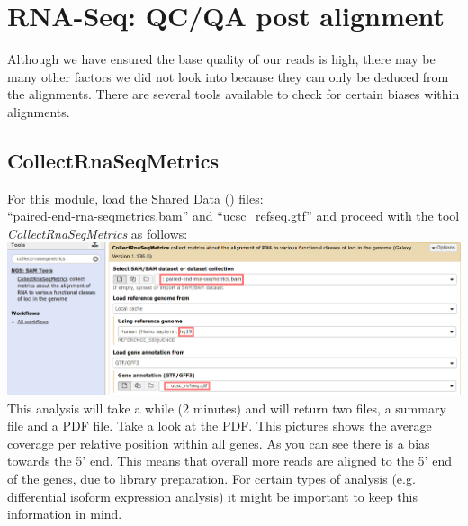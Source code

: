 \section{RNA-Seq: QC/QA post alignment}
Although we have ensured the base quality of our reads is high, there may be many other factors we did not look into because they can only be deduced from the alignments.
There are several tools available to check for certain biases within alignments.

\subsection{CollectRnaSeqMetrics}
For this module, load the Shared Data (\textit{\datalibrarydirrnaseqadvanced}) files:\\
``paired-end-rna-seqmetrics.bam'' and ``ucsc\_refseq.gtf'' and proceed with the tool \textit{CollectRnaSeqMetrics} as follows:\\
\includegraphics[width=\textwidth]{figures/qc2_01.png}\\
This analysis will take a while (2 minutes) and will return two files, a summary file and a PDF file.
Take a look at the PDF.
This pictures shows the average coverage per relative position within all genes.
As you can see there is a bias towards the 5' end.
This means that overall more reads are aligned to the 5' end of the genes, due to library preparation.
For certain types of analysis (e.g. differential isoform expression analysis) it might be important to keep this information in mind.

